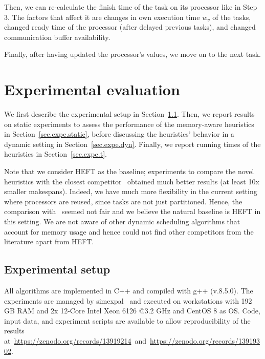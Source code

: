 \documentclass[conference]{IEEEtran}
\newcommand{\hmey}[1]{{\color{red}[HM: #1]}}
\begin{document}
Then, we can re-calculate the finish time of the task on its processor like in Step 3.
The factors that affect it are changes in own execution time $w_v$ of the tasks, changed ready time of the processor
(after delayed previous tasks), and changed communication buffer availability.

Finally, after having updated the processor's values, we move on to the next task.





\section{Experimental evaluation}
\label{sec:expe}
%
We first describe the experimental setup in Section~\ref{sec:setup}. 
Then, we report results on static experiments to assess the performance
of the memory-aware heuristics in Section~\ref{sec.expe.static}, before
discussing the heuristics' behavior in a dynamic setting in Section~\ref{sec.expe.dyn}. 
Finally, we report running times of the heuristics in Section~\ref{sec.expe.t}. 

Note that we consider HEFT as the baseline; experiments to compare the novel heuristics
with the closest competitor~\cite{DBLP:conf/icpp/KulaginaMB24} obtained much better results 
(at least 10x smaller makespans). 
Indeed, we have much more flexibility in the current setting where processors are reused, since tasks
are not just partitioned. Hence, the comparison with~\cite{DBLP:conf/icpp/KulaginaMB24} seemed not fair
and we believe the natural baseline is HEFT in this setting. 
We are not aware of other dynamic scheduling algorithms that account for memory usage 
and hence could not find other competitors from the literature apart from HEFT. 




\subsection{Experimental setup}
\label{sec:setup}
%
All algorithms are implemented in C++ and compiled with g++ (v.8.5.0).
The experiments are managed by simexpal~\cite{DBLP:journals/algorithms/AngrimanGLMNPT19} and executed on workstations with 192 GB RAM and 2x 12-Core Intel Xeon 6126 @3.2 GHz
and CentOS 8 as OS.
Code, input data, and experiment scripts are available to allow reproducibility of the results at~\url{https://zenodo.org/records/13919214}~and~\url{https://zenodo.org/records/13919302}.
\end{document}
